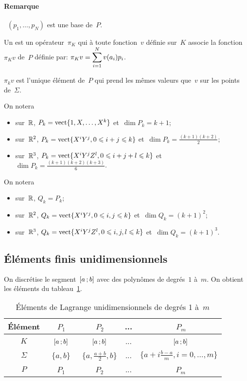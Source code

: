 \paragraph{Remarque}~$(p_1,\ldots, p_N)$ est une base de~$P$.
\medskip
\begin{definition}
Un  est un opérateur~$\pi_K$ qui à toute fonction~$v$ définie sur~$K$ associe la fonction~$\pi_Kv$ de~$P$ définie par: $\pi_Kv=\displaystyle\sum_{i=1}^N v(a_i)p_i$.
\end{definition}
\begin{theoreme}
$\pi_kv$ est l'unique élément de~$P$ qui prend les mêmes valeurs que~$v$ sur les points de~$\Sigma$.
\end{theoreme}
\medskip
On notera 
\begin{itemize}
\item sur~$\mathbb R$, $P_k=\operatorname{vect}\{1, X,\ldots, X^k\}$ et~$\dim P_k=k+1$;
\item sur~$\mathbb R^2$, $P_k=\operatorname{vect}\{X^iY^j, 0\leqslant i+j\leqslant k\}$ et~$\dim P_k=\frac{(k+1)(k+2)}2$;
\item sur~$\mathbb R^3$, $P_k=\operatorname{vect}\{X^iY^jZ^l, 0\leqslant i+j+l\leqslant k\}$ et~$\dim P_k=\frac{(k+1)(k+2)(k+3)}6$.
\end{itemize}
\medskip
On notera 
\begin{itemize}
\item sur~$\mathbb R$, $Q_k=P_k$;
\item sur~$\mathbb R^2$, $Q_k=\operatorname{vect}\{X^iY^j, 0\leqslant i,j\leqslant k\}$ et~$\dim Q_k=(k+1)^2$;
\item sur~$\mathbb R^3$, $Q_k=\operatorname{vect}\{X^iY^jZ^l, 0\leqslant i,j,l\leqslant k\}$ et~$\dim Q_k=(k+1)^3$.
\end{itemize}



\medskip
\subsection*{Éléments finis unidimensionnels}
On discrétise le segment~$\mathopen{[}a\,;b\mathclose{]}$ avec des polynômes de degrés~$1$ à~$m$.
On obtient les éléments du tableau~\ref{tab:Elem:uni}.
\begin{table}[ht]\centering\small
\begin{tabular}{c|cccc}
Élément &~$P_1$ &~$P_2$ & ... &~$P_m$\\
\hline
$K$	  &~$\mathopen{[}a\,;b\mathclose{]}$ &~$\mathopen{[}a\,;b\mathclose{]}$ & ... &~$\mathopen{[}a\,;b\mathclose{]}$\\
$\Sigma$ &~$\{a,b\}$ &~$\{a,\frac{a+b}2, b\}$& ... &$\{a+i\frac{b-a}m, i=0,\ldots, m\}$\\
$P$   &~$P_1$ &~$P_2$ & ... &~$P_m$\\
\hline
\end{tabular}
\caption{Éléments de Lagrange unidimensionnels de degrés 1 à~$m$}\label{tab:Elem:uni}
\end{table}

